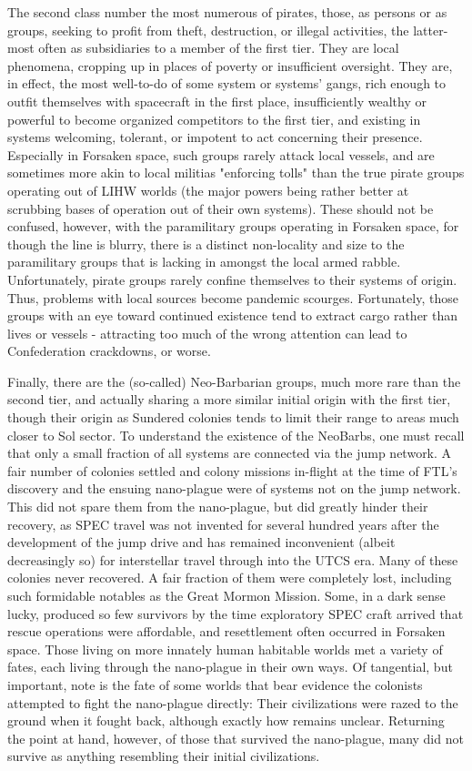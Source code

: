 The second class number the most numerous of pirates, those, as
persons or as groups, seeking to profit from theft, destruction, or
illegal activities, the latter-most often as subsidiaries to a member
of the first tier. They are local phenomena, cropping up in places of
poverty or insufficient oversight. They are, in effect, the most
well-to-do of some system or systems' gangs, rich enough to outfit
themselves with spacecraft in the first place, insufficiently wealthy
or powerful to become organized competitors to the first tier, and
existing in systems welcoming, tolerant, or impotent to act concerning
their presence. Especially in Forsaken space, such groups rarely
attack local vessels, and are sometimes more akin to local militias
"enforcing tolls" than the true pirate groups operating out of LIHW
worlds (the major powers being rather better at scrubbing bases of
operation out of their own systems). These should not be confused,
however, with the paramilitary groups operating in Forsaken space, for
though the line is blurry, there is a distinct non-locality and size
to the paramilitary groups that is lacking in amongst the local armed
rabble. Unfortunately, pirate groups rarely confine themselves to
their systems of origin. Thus, problems with local sources become
pandemic scourges. Fortunately, those groups with an eye toward
continued existence tend to extract cargo rather than lives or vessels
- attracting too much of the wrong attention can lead to Confederation
crackdowns, or worse.

Finally, there are the (so-called) Neo-Barbarian groups, much more
rare than the second tier, and actually sharing a more similar initial
origin with the first tier, though their origin as Sundered colonies
tends to limit their range to areas much closer to Sol sector. To
understand the existence of the NeoBarbs, one must recall that only a
small fraction of all systems are connected via the jump network. A
fair number of colonies settled and colony missions in-flight at the
time of FTL's discovery and the ensuing nano-plague were of systems
not on the jump network. This did not spare them from the nano-plague,
but did greatly hinder their recovery, as SPEC travel was not invented
for several hundred years after the development of the jump drive and
has remained inconvenient (albeit decreasingly so) for interstellar
travel through into the UTCS era.  Many of these colonies never
recovered. A fair fraction of them were completely lost, including
such formidable notables as the Great Mormon Mission. Some, in a dark
sense lucky, produced so few survivors by the time exploratory SPEC
craft arrived that rescue operations were affordable, and resettlement
often occurred in Forsaken space. Those living on more innately human
habitable worlds met a variety of fates, each living through the
nano-plague in their own ways. Of tangential, but important, note is
the fate of some worlds that bear evidence the colonists attempted to
fight the nano-plague directly: Their civilizations were razed to the
ground when it fought back, although exactly how remains
unclear. Returning the point at hand, however, of those that survived
the nano-plague, many did not survive as anything resembling their
initial civilizations.

